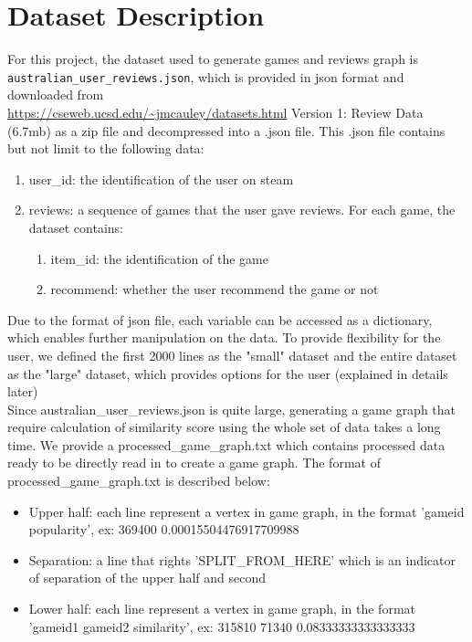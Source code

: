 \documentclass{article}
\begin{document}
\section{Dataset Description}
For this project, the dataset used to generate games and reviews graph is \\
\texttt{australian\_user\_reviews.json}, which is provided in json format and downloaded from\\ \url{https://cseweb.ucsd.edu/~jmcauley/datasets.html} Version 1: Review Data (6.7mb) as a zip file and decompressed into a .json file. This .json file contains but not limit to the following data:\\
\begin{enumerate}
    \item user\_id: the identification of the user on steam
    \item reviews: a sequence of games that the user gave reviews. For each game, the dataset contains:
    \begin{enumerate}
        \item item\_id: the identification of the game
        \item recommend: whether the user recommend the game or not
    \end{enumerate}
\end{enumerate}
Due to the format of json file, each variable can be accessed as a dictionary, which enables further manipulation on the data. To provide flexibility for the user, we defined the first 2000 lines as the "small" dataset and the entire dataset as the "large" dataset, which provides options for the user (explained in details later)\\

Since australian\_user\_reviews.json is quite large, generating a game graph that require calculation of similarity score using the whole set of data takes a long time. We provide a processed\_game\_graph.txt which contains processed data ready to be directly read in to create a game graph. The format of processed\_game\_graph.txt is described below: 
\begin{itemize}
\item  Upper half: each line represent a vertex in game graph, in the format 'gameid popularity', ex: 369400 0.00015504476917709988 
\item Separation: a line that rights 'SPLIT\_FROM\_HERE' which is an indicator of separation of the upper half and second 
\item Lower half: each line represent a vertex in game graph, in the format 'gameid1 gameid2 similarity', ex: 315810 71340 0.08333333333333333 
\end{itemize} 
\end{document}
